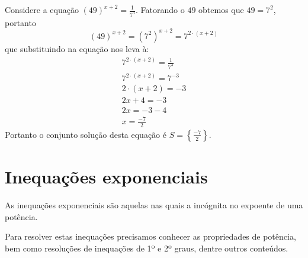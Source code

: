 \begin{exem}
 Considere a equação $(49)^{x+2}= \frac{1}{7^3}$. Fatorando o $49$ obtemos que $49= 7^2$, portanto
\begin{equation*}
(49)^{x+2}= (7^2)^{x+2}= 7^{2\cdot (x+2)}
\end{equation*}
 que substituindo na equação nos leva à:
 \begin{eqnarray*}
  7^{2\cdot (x+2)}= \frac{1}{7^3} \\
  7^{2\cdot (x+2)}= 7^{-3} \\
  2\cdot (x+2) = -3 \\
  2x + 4 = -3 \\
  2x= -3 -4 \\
  x= \frac{-7}{2}
 \end{eqnarray*}
 Portanto o conjunto solução desta equação é $S= \left\{ \frac{-7}{2} \right\}$.
\end{exem}

 \section{Inequações exponenciais}
 
\begin{obs}
 As inequações exponenciais são aquelas nas quais  a incógnita no expoente de uma potência.
\end{obs}
 
 Para resolver estas inequações precisamos conhecer as propriedades de potência, bem como resoluções de inequações de 1º e 2º graus, dentre outros conteúdos. 
 

 
 
